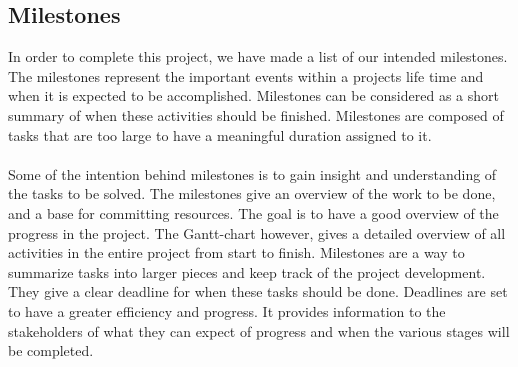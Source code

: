 \subsection{Milestones}
In order to complete this project, we have made a list of our intended milestones. The milestones represent the important events within a projects life time and when it is expected to be accomplished. Milestones can be considered as a short summary of when these activities should be finished. Milestones are composed of tasks that are too large to have a meaningful duration assigned to it. 
\\\\
Some of the intention behind milestones is to gain insight and understanding of the tasks to be solved. The milestones give an overview of the work to be done, and a base for committing resources. The goal is to have a good overview of the progress in the project. The Gantt-chart however, gives a detailed overview of all activities in the entire project from start to finish. Milestones are a way to summarize tasks into larger pieces and keep track of the project development. They give a clear deadline for when these tasks should be done. Deadlines are set to have a greater efficiency and progress. It provides information to the stakeholders of what they can expect of progress and when the various stages will be completed.\\
